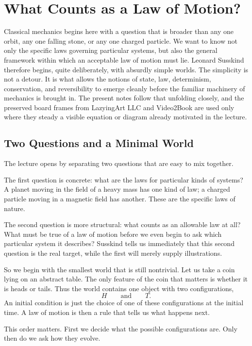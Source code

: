 \chapter{What Counts as a Law of Motion?}

Classical mechanics begins here with a question that is broader than any one orbit, any one falling stone, or any one charged particle. We want to know not only the specific laws governing particular systems, but also the general framework within which an acceptable law of motion must lie. Leonard Susskind therefore begins, quite deliberately, with absurdly simple worlds. The simplicity is not a detour. It is what allows the notions of state, law, determinism, conservation, and reversibility to emerge cleanly before the familiar machinery of mechanics is brought in. The present notes follow that unfolding closely, and the preserved board frames from LazyingArt LLC and Video2Book are used only where they steady a visible equation or diagram already motivated in the lecture.

\section{Two Questions and a Minimal World}

The lecture opens by separating two questions that are easy to mix together.

The first question is concrete: what are the laws for particular kinds of systems? A planet moving in the field of a heavy mass has one kind of law; a charged particle moving in a magnetic field has another. These are the specific laws of nature.

The second question is more structural: what counts as an allowable law at all? What must be true of a law of motion before we even begin to ask which particular system it describes? Susskind tells us immediately that this second question is the real target, while the first will merely supply illustrations.

So we begin with the smallest world that is still nontrivial. Let us take a coin lying on an abstract table. The only feature of the coin that matters is whether it is heads or tails. Thus the world contains one object with two configurations,
\[
H \qquad \text{and} \qquad T.
\]
An initial condition is just the choice of one of these configurations at the initial time. A law of motion is then a rule that tells us what happens next.

This order matters. First we decide what the possible configurations are. Only then do we ask how they evolve.

